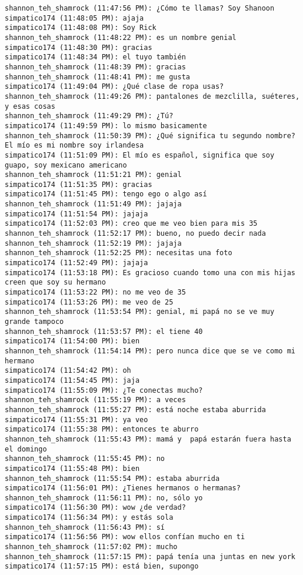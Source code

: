\begin{verbatim}
shannon_teh_shamrock (11:47:56 PM): ¿Cómo te llamas? Soy Shanoon
simpatico174 (11:48:05 PM): ajaja
simpatico174 (11:48:08 PM): Soy Rick
shannon_teh_shamrock (11:48:22 PM): es un nombre genial
simpatico174 (11:48:30 PM): gracias
simpatico174 (11:48:34 PM): el tuyo también
shannon_teh_shamrock (11:48:39 PM): gracias
shannon_teh_shamrock (11:48:41 PM): me gusta
simpatico174 (11:49:04 PM): ¿Qué clase de ropa usas?
shannon_teh_shamrock (11:49:26 PM): pantalones de mezclilla, suéteres, y esas cosas
shannon_teh_shamrock (11:49:29 PM): ¿Tú?
simpatico174 (11:49:59 PM): lo mismo basicamente
shannon_teh_shamrock (11:50:39 PM): ¿Qué significa tu segundo nombre? El mío es mi nombre soy irlandesa 
simpatico174 (11:51:09 PM): El mío es español, significa que soy guapo, soy mexicano americano
shannon_teh_shamrock (11:51:21 PM): genial
simpatico174 (11:51:35 PM): gracias 
simpatico174 (11:51:45 PM): tengo ego o algo así
shannon_teh_shamrock (11:51:49 PM): jajaja
simpatico174 (11:51:54 PM): jajaja
simpatico174 (11:52:03 PM): creo que me veo bien para mis 35
shannon_teh_shamrock (11:52:17 PM): bueno, no puedo decir nada
shannon_teh_shamrock (11:52:19 PM): jajaja
shannon_teh_shamrock (11:52:25 PM): necesitas una foto
simpatico174 (11:52:49 PM): jajaja
simpatico174 (11:53:18 PM): Es gracioso cuando tomo una con mis hijas creen que soy su hermano 
simpatico174 (11:53:22 PM): no me veo de 35
simpatico174 (11:53:26 PM): me veo de 25
shannon_teh_shamrock (11:53:54 PM): genial, mi papá no se ve muy grande tampoco
shannon_teh_shamrock (11:53:57 PM): el tiene 40
simpatico174 (11:54:00 PM): bien
shannon_teh_shamrock (11:54:14 PM): pero nunca dice que se ve como mi hermano
simpatico174 (11:54:42 PM): oh
simpatico174 (11:54:45 PM): jaja
simpatico174 (11:55:09 PM): ¿Te conectas mucho?
shannon_teh_shamrock (11:55:19 PM): a veces
shannon_teh_shamrock (11:55:27 PM): está noche estaba aburrida
simpatico174 (11:55:31 PM): ya veo
simpatico174 (11:55:38 PM): entonces te aburro
shannon_teh_shamrock (11:55:43 PM): mamá y  papá estarán fuera hasta el domingo
shannon_teh_shamrock (11:55:45 PM): no
simpatico174 (11:55:48 PM): bien
shannon_teh_shamrock (11:55:54 PM): estaba aburrida
simpatico174 (11:56:01 PM): ¿Tienes hermanos o hermanas?
shannon_teh_shamrock (11:56:11 PM): no, sólo yo
simpatico174 (11:56:30 PM): wow ¿de verdad?
simpatico174 (11:56:34 PM): y estás sola
shannon_teh_shamrock (11:56:43 PM): sí
simpatico174 (11:56:56 PM): wow ellos confían mucho en ti
shannon_teh_shamrock (11:57:02 PM): mucho
shannon_teh_shamrock (11:57:15 PM): papá tenía una juntas en new york
simpatico174 (11:57:15 PM): está bien, supongo

\end{verbatim}
